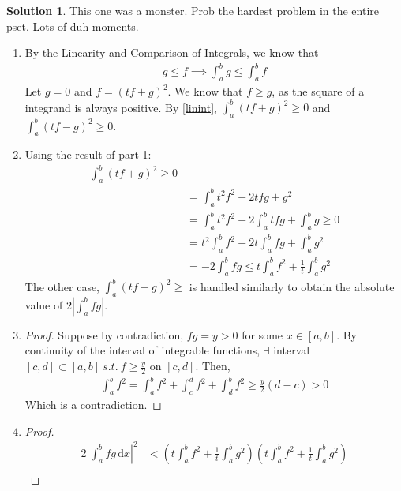 \documentclass[12pt]{article}
\theoremstyle{definition} %
\newtheorem{solution}{Solution}
\theoremstyle{plain} %
\begin{document}
\begin{solution}
    This one was a monster. Prob the hardest problem in the entire pset. Lots of duh moments.
    \begin{enumerate}
        \item By the Linearity and Comparison of Integrals, we know that 
        \begin{align}
            g\leq f \implies \int_{a}^{b} g \leq \int_{a}^{b} f \label{linint}   
        \end{align}
        Let $g=0$ and $f = (tf+g)^{2}$. We know that $f\geq g$, as the square of a integrand is always positive. By \autoref{linint}, $\int_{a}^{b} (tf+g)^{2}  \geq 0$ and $\int_{a}^{b} (tf-g)^{2}\geq 0 $.    
        \item Using the result of part 1:
        \begin{align}
            \int_{a}^{b} (tf+g)^{2} \geq 0\\[10pt]  
            &= \int_{a}^{b} t^{2}f^{2} + 2tfg + g^{2} \\[10pt] 
            &= \int_{a}^{b} t^{2}f^{2} + 2\int_{a}^{b} tfg + \int_{a}^{b} g \geq 0 \\[10pt] 
            &= t^{2}\int_{a}^{b} f^{2} + 2t\int_{a}^{b} fg + \int_{a}^{b} g^{2} \\[10pt] 
            &= -2\int_{a}^{b} fg \leq t\int_{a}^{b} f^{2} + \frac{1}{t}\int_{a}^{b} g^{2}         
        \end{align}
        The other case, $\int_{a}^{b} (tf-g)^{2}\geq  $ is handled similarly to obtain the absolute value of $2\left\vert \int_{a}^{b} fg   \right\vert $.
        \item \begin{proof}
            Suppose by contradiction, $fg=y>0$ for some $x\in[a,b]$. By continuity of the interval of integrable functions, $\exists $ interval $[c,d] \subset [a,b]\ s.t. \ f\geq \frac{y}{2}$ on $[c,d]$. Then,
        \begin{align}
            \int_{a}^{b} f^{2} = \int_{a}^{b} f^{2}+\int_{c}^{d} f^{2}+\int_{d}^{b} f^{2}\geq \frac{y}{2}(d-c)>0         
        \end{align}  
            Which is a contradiction.
        \end{proof}
        \item \begin{proof}
           \begin{align}
            2\left\vert \int_{a}^{b} fg \,\mathrm{d}x  \right\vert^{2}&< \left( t\int_{a}^{b} f^{2} +\frac{1}{t}\int_{a}^{b} g^{2}    \right)\left( t\int_{a}^{b} f^{2} +\frac{1}{t}\int_{a}^{b} g^{2}   \right) \\[10pt] 

\end{align}
\end{proof}
\end{enumerate}
\end{solution}
\end{document}
